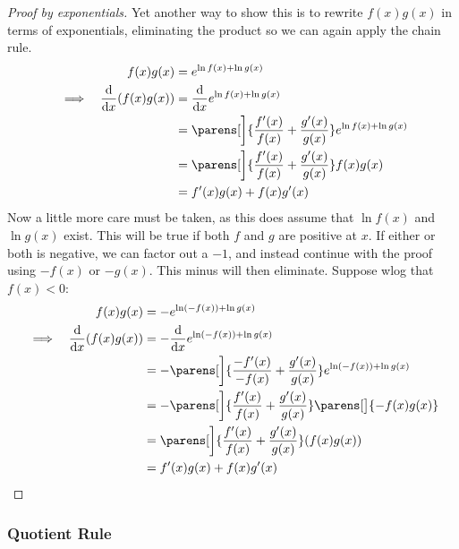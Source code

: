 \begin{proof}[Proof by exponentials]
    Yet another way to show this is to rewrite \(f(x)g(x)\) in terms of
    exponentials, eliminating the product so we can again apply the chain rule.
    \begin{alignat*}{2}
        && f(x)g(x) &= e^{\ln f(x) + \ln g(x)} \\
        &\implies& \dv{x} (f(x)g(x))
                    &= \dv{x} e^{\ln f(x) + \ln g(x)} \\
        &&          &= \parens[\bigg]{\frac{f'(x)}{f(x)} + \frac{g'(x)}{g(x)}}
                         e^{\ln f(x) + \ln g(x)} \\
        &&          &= \parens[\bigg]{\frac{f'(x)}{f(x)} + \frac{g'(x)}{g(x)}}
                         f(x)g(x) \\
        &&          &= f'(x)g(x) + f(x)g'(x)
    \end{alignat*}
    Now a little more care must be taken, as this does assume that \(\ln f(x)\)
    and \(\ln g(x)\) exist. This will be true if both \(f\) and \(g\) are
    positive at \(x\). If either or both is negative, we can factor out a
    \(-1\), and instead continue with the proof using \(-f(x)\) or \(-g(x)\).
    This minus will then eliminate. Suppose wlog that \(f(x) < 0\):
    \begin{alignat*}{2}
        && f(x)g(x) &= -e^{\ln(-f(x)) + \ln g(x)} \\
        &\implies& \dv{x} (f(x)g(x))
                    &= -\dv{x} e^{\ln(-f(x)) + \ln g(x)} \\
        &&          &= -\parens[\bigg]{\frac{-f'(x)}{-f(x)}
                                     + \frac{g'(x)}{g(x)}}
                         e^{\ln(-f(x)) + \ln g(x)} \\
        &&          &= -\parens[\bigg]{\frac{f'(x)}{f(x)} + \frac{g'(x)}{g(x)}}
                         \parens[\big]{-f(x)g(x)} \\
        &&          &= \parens[\bigg]{\frac{f'(x)}{f(x)} + \frac{g'(x)}{g(x)}}
                         (f(x)g(x)) \\
        &&          &= f'(x)g(x) + f(x)g'(x) \qedhere
    \end{alignat*}
\end{proof}

\subsubsection{Quotient Rule} \label{sec_calc_quotient}


